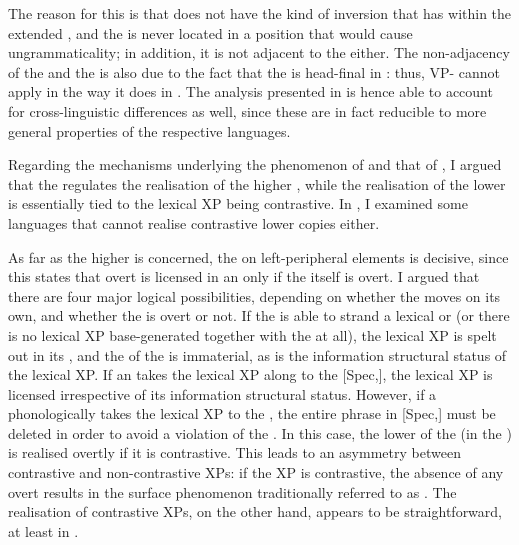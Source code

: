 The reason for this is that  does not have the kind of inversion that  has within the extended , and the  is never located in a position that would cause ungrammaticality; in addition, it is not adjacent to the  either. The non-adjacency of the  and the  is also due to the fact that the  is head-final in : thus, VP- cannot apply in the way it does in . The analysis presented in  is hence able to account for cross-linguistic differences as well, since these are in fact reducible to more general properties of the respective languages.

Regarding the mechanisms underlying the phenomenon of  and that of , I argued that the  regulates the realisation of the higher , while the realisation of the lower  is essentially tied to the lexical XP being contrastive. In , I examined some languages that cannot realise contrastive lower copies either.

As far as the higher  is concerned, the  on left-peripheral elements is decisive, since this states that overt  is licensed in an  only if the  itself is overt. I argued that there are four major logical possibilities, depending on whether the  moves on its own, and whether the  is overt or not. If the  is able to strand a lexical  or  (or there is no lexical XP base-generated together with the  at all), the lexical XP is spelt out in its , and the  of the  is immaterial, as is the information structural status of the lexical XP. If an  takes the lexical XP along to the [Spec,], the lexical XP is licensed irrespective of its information structural status. However, if a phonologically  takes the lexical XP to the  , the entire phrase in [Spec,] must be deleted in order to avoid a violation of the . In this case, the lower  of the  (in the ) is realised overtly if it is contrastive. This leads to an asymmetry between contrastive and non-contrastive XPs: if the XP is contrastive, the absence of any overt  results in the surface phenomenon traditionally referred to as . The realisation of contrastive XPs, on the other hand, appears to be straightforward, at least in .

